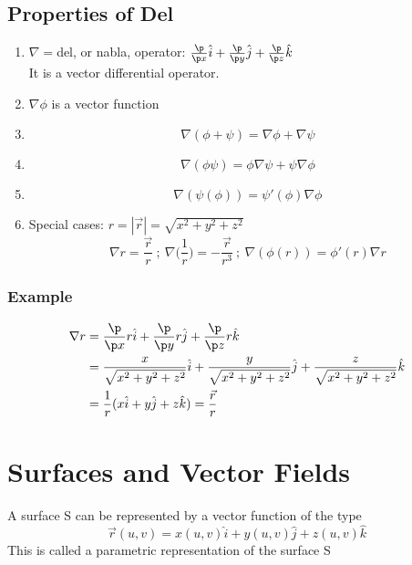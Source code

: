 \documentclass[a4paper, 11pt, normalem]{report}
\begin{document}
\subsection{Properties of Del}
\begin{enumerate}
    \item $\nabla = $del, or nabla, operator: $\frac{\p}{\p x}\hat{i} + \frac{\p}{\p y}\hat{j} + \frac{\p}{\p z}\hat{k}$ \\
    It is a vector differential operator.
    \item $\nabla\phi$ is a vector function
    \item
            \begin{equation*}
                \nabla(\phi + \psi) = \nabla\phi + \nabla\psi
            \end{equation*}
    \item
            \begin{equation*}
                \nabla(\phi\psi) = \phi\nabla\psi + \psi\nabla\phi
            \end{equation*}
    \item
            \begin{equation*}
                \nabla(\psi(\phi)) = \psi'(\phi)\nabla\phi
            \end{equation*}
    \item Special cases: $r = |\vec{r}| = \sqrt{x^2 + y^2 + z^2}$
            \begin{equation*}
                \nabla r = \frac{\vec{r}}{r} ~;~ \nabla\Big(\frac{1}{r}\Big) = -\frac{\vec{r}}{r^3} ~;~ \nabla(\phi(r)) = \phi'(r)\nabla r
            \end{equation*}
\end{enumerate}

\subsubsection{Example}
\begin{align*}
    \nabla r &= \frac{\p}{\p x}r\hat{i} + \frac{\p}{\p y}r\hat{j} + \frac{\p}{\p z}r\hat{k} \\
    &= \frac{x}{\sqrt{x^2 + y^2 + z^2}}\hat{i} + \frac{y}{\sqrt{x^2 + y^2 + z^2}}\hat{j} + \frac{z}{\sqrt{x^2 + y^2 + z^2}}\hat{k} \\
    &= \frac{1}{r}(x\hat{i} + y\hat{j} + z\hat{k}) = \frac{\vec{r}}{r}
\end{align*}

\section{Surfaces and Vector Fields}
A surface S can be represented by a vector function of the type
\begin{equation*}
    \vec{r}(u,v) = x(u,v)\hat{i} + y(u,v)\hat{j} + z(u,v)\hat{k}
\end{equation*}
This is called a parametric representation of the surface S
\end{document}
